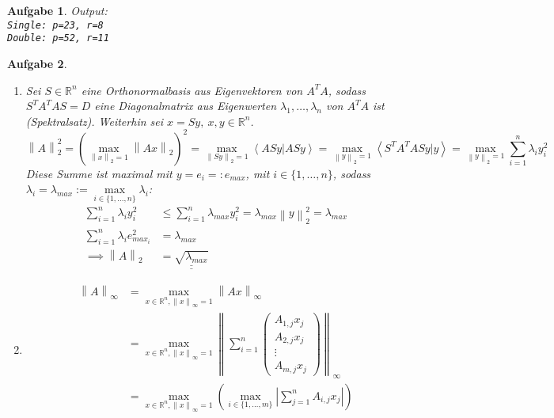 \documentclass[11pt]{article}
\theoremstyle{break}
\newtheorem{task}{Aufgabe}
\newcommand{\set}[1]{\ensuremath{\{#1\}}}
\newcommand{\abs}[1]{\ensuremath{\left\vert #1 \right\vert}}
\newcommand{\norm}[1]{\ensuremath{\left\| #1 \right\|}}
\newcommand{\skal}[2]{\ensuremath{\left\langle #1 | #2 \right\rangle}}
\newcommand{\R}{\ensuremath{\mathbb{R}}}
\begin{document}
\newpage
\begin{task}
    \hfill\vspace{-5mm}
    
    Output:\\
    \texttt{Single: p=23, r=8\\
    Double: p=52, r=11}
    
\end{task}
\newpage
\begin{task}
    \hfill\vspace{-5mm}
    \begin{enumerate} [label={(\alph*)}]
        \item Sei $S\in \R^n$ eine Orthonormalbasis aus Eigenvektoren von $A^TA$, sodass $S^TA^TAS=D$ eine Diagonalmatrix aus Eigenwerten $\lambda_1, \dots, \lambda_n$ von $A^TA$ ist (Spektralsatz). Weiterhin sei $x = Sy,\ x,y\in\R^n$.
        $$\norm{A}_2^2 = (\max\limits_{\norm{x}_2 = 1} \norm{Ax}_2)^2 = \max\limits_{\norm{Sy}_2 = 1} \skal{ASy}{ASy} = \max\limits_{\norm{y}_2 = 1} \skal{S^TA^TASy}{y} = \max\limits_{\norm{y}_2 = 1} \sum\limits_{i=1}^n \lambda_i y_i^2$$
        Diese Summe ist maximal mit $y=e_i=:e_{max}$, mit $i\in \set{1,\dots, n}$, sodass $\lambda_i = \lambda_{max} := \max\limits_{i\in\set{1,\dots,n}} \lambda_i$:
        \begin{align*}
            \sum\limits_{i=1}^n \lambda_i y_i^2&\leq \sum\limits_{i=1}^n \lambda_{max} y_i^2 = \lambda_{max} \norm{y}_2^2 = \lambda_{max}\\
            \sum\limits_{i=1}^n \lambda_i e_{max_i}^2 &= \lambda_{max}\\
            \implies \norm{A}_2 &= \underline{\underline{\sqrt{\lambda_{max}}}}
        \end{align*}
        \item \begin{align*}
            \norm{A}_\infty &= \max\limits_{x\in \R^n, \norm{x}_\infty = 1}\norm{Ax}_\infty\\
            &= \max\limits_{x\in \R^n, \norm{x}_\infty = 1}\norm{\sum\limits_{i=1}^n\left(
            \begin{matrix}
                A_{1,j}x_j\\
                A_{2,j}x_j\\
                \vdots\\
                A_{m,j}x_j
            \end{matrix}
            \right)}_\infty\\
            &= \max\limits_{x\in \R^n, \norm{x}_\infty = 1}\left(\max\limits_{i\in\set{1,\dots,m}}\abs{\sum\limits_{j=1}^n A_{i,j}x_j}\right)\\

\end{align*}
\end{enumerate}
\end{task}
\end{document}
